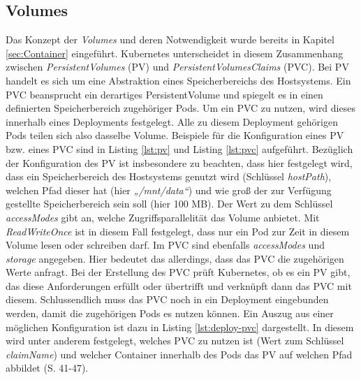 \documentclass[11pt,a4paper]{article}
\begin{document}
\subsection{Volumes}
Das Konzept der \emph{Volumes} und deren Notwendigkeit wurde bereits in Kapitel \ref{sec:Container} eingeführt.
Kubernetes unterscheidet in diesem Zusammenhang zwischen \emph{PersistentVolumes} (PV) und \emph{PersistentVolumesClaims} (PVC).
Bei PV handelt es sich um eine Abstraktion eines Speicherbereichs des Hostsystems.
Ein PVC beansprucht ein derartiges PersistentVolume und spiegelt es in einen
definierten Speicherbereich zugehöriger Pods. Um ein PVC zu nutzen, wird dieses innerhalb eines Deployments festgelegt.
Alle zu diesem Deployment gehörigen Pods teilen sich also dasselbe Volume.
Beispiele für die Konfiguration eines PV bzw. eines PVC sind in Listing \ref{lst:pv} und Listing \ref{lst:pvc}
aufgeführt. Bezüglich der Konfiguration des PV ist insbesondere zu beachten, dass hier
festgelegt wird, dass ein Speicherbereich des Hostsystems genutzt wird (Schlüssel \emph{hostPath}),
welchen Pfad dieser hat (hier \emph{„/mnt/data“})
und wie groß der zur Verfügung gestellte Speicherbereich sein soll (hier 100 MB).
Der Wert zu dem Schlüssel \emph{accessModes} gibt an, welche Zugriffsparallelität das Volume anbietet.
Mit \emph{ReadWriteOnce} ist in diesem Fall festgelegt, dass nur ein Pod zur Zeit
in diesem Volume lesen oder schreiben darf.
Im PVC sind ebenfalls \emph{accessModes} und \emph{storage} angegeben. Hier
bedeutet das allerdings, dass das PVC die zugehörigen Werte anfragt.
Bei der Erstellung des PVC prüft Kubernetes, ob es ein PV gibt,
das diese Anforderungen erfüllt oder übertrifft und verknüpft dann das PVC mit diesem.
Schlussendlich muss das PVC noch in ein Deployment eingebunden werden, damit die zugehörigen
Pods es nutzen können. Ein Auszug aus einer möglichen Konfiguration ist dazu in
Listing \ref{lst:deploy-pvc} dargestellt. In diesem wird unter anderem festgelegt,
welches PVC zu nutzen ist (Wert zum Schlüssel \emph{claimName}) und welcher Container
innerhalb des Pods das PV auf welchen Pfad abbildet \cite{Schmeling_Dargatz_2022} (S. 41-47).




\end{document}
